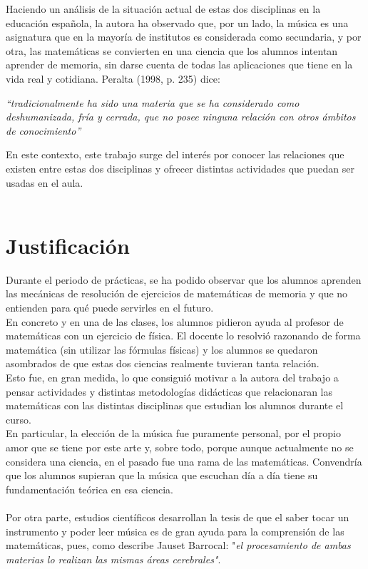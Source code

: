 \documentclass[a4paper, openright, 11pt, titlepage]{report}
\theoremstyle{definition}\newtheorem{defin}[propo]{Definition}
\theoremstyle{definition}\newtheorem{obser}[propo]{Remark}
\theoremstyle{definition}\newtheorem{ejem}[propo]{Ejemplo}
\theoremstyle{definition}\newtheorem{algoritmo}[propo]{Algoritmo}
\begin{document}
Haciendo un análisis de la situación actual de estas dos disciplinas en la educación española, la autora ha observado que, por un lado, la música es una asignatura que en la mayoría de institutos es considerada como secundaria, y por otra, las matemáticas se convierten en una ciencia que los alumnos intentan aprender de memoria, sin darse cuenta de todas las aplicaciones que tiene en la vida real y cotidiana. Peralta (1998, p. 235) dice:
\begin{center}
    \textit{“tradicionalmente ha sido una materia que se ha considerado como deshumanizada, fría y cerrada, que no posee ninguna relación con otros ámbitos de conocimiento”}
\end{center}
En este contexto, este trabajo surge del interés por conocer las relaciones que existen entre estas dos disciplinas y ofrecer distintas actividades que puedan ser usadas en el aula. \\\\



\section{Justificación}
Durante el periodo de prácticas, se ha podido observar que los alumnos aprenden las mecánicas de resolución de ejercicios de matemáticas de memoria y que no entienden para qué puede servirles en el futuro.\\
En concreto y en una de las clases, los alumnos pidieron ayuda al profesor de matemáticas con un ejercicio de física. El docente lo resolvió razonando de forma matemática (sin utilizar las fórmulas físicas) y los alumnos se quedaron asombrados de que estas dos ciencias realmente tuvieran tanta relación.\\
Esto fue, en gran medida, lo que consiguió motivar a la autora del trabajo a pensar actividades y distintas metodologías didácticas que relacionaran las matemáticas con las distintas disciplinas que estudian los alumnos durante el curso.\\
En particular, la elección de la música fue puramente personal, por el propio amor que se tiene por este arte y, sobre todo, porque aunque actualmente no se considera una ciencia, en el pasado fue una rama de las matemáticas. Convendría que los alumnos supieran que la música que escuchan día a día tiene su fundamentación teórica en esa ciencia.\\\\
Por otra parte, estudios científicos desarrollan la tesis de que el saber tocar un instrumento y poder leer música es de gran ayuda para la comprensión de las matemáticas, pues, como describe Jauset Barrocal: "\textit{el procesamiento de ambas materias lo realizan las mismas áreas cerebrales"}.
 
\end{document}
